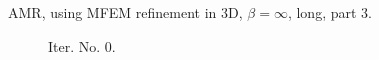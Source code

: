 \documentclass[a4paper,12pt]{amsart}
\numberwithin{equation}{section}
\begin{document}
\begin{figure}[h!]
\caption{AMR, using MFEM refinement in 3D, $\beta = \infty$, long, part 3.}
\label{fig:amr_trans3D_paraview_mfem_longrun_part3}
\end{figure}

\begin{figure}[h!]
\centering
\begin{subfigure}[t]{0.49\textwidth}
    \caption{Iter. No. 0.}
\end{subfigure}
	\hfill
\begin{subfigure}[t]{0.49\textwidth}

\end{subfigure}
\end{figure}
\end{document}
